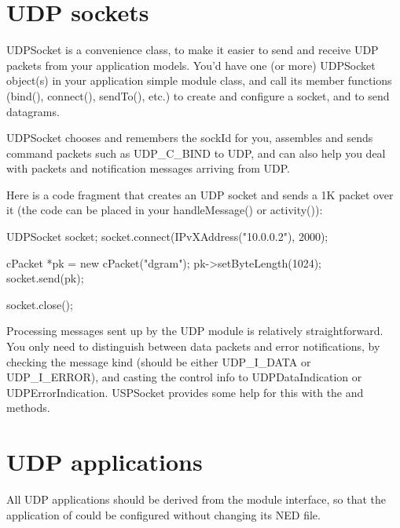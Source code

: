 \section{UDP sockets}

UDPSocket is a convenience class, to make it easier to send and receive
UDP packets from your application models. You'd have one (or more)
UDPSocket object(s) in your application simple module class, and call
its member functions (bind(), connect(), sendTo(), etc.) to create and
configure a socket, and to send datagrams.

UDPSocket chooses and remembers the sockId for you, assembles and sends command
packets such as UDP\_C\_BIND to UDP, and can also help you deal with packets and
notification messages arriving from UDP.

Here is a code fragment that creates an UDP socket and sends a 1K packet
over it (the code can be placed in your handleMessage() or activity()):

\begin{cpp}
UDPSocket socket;
socket.connect(IPvXAddress("10.0.0.2"), 2000);

cPacket *pk = new cPacket("dgram");
pk->setByteLength(1024);
socket.send(pk);

socket.close();
\end{cpp}


Processing messages sent up by the UDP module is relatively straightforward.
You only need to distinguish between data packets and error notifications,
by checking the message kind (should be either UDP\_I\_DATA or UDP\_I\_ERROR),
and casting the control info to UDPDataIndication or UDPErrorIndication.
USPSocket provides some help for this with the  and
 methods.

\section{UDP applications}

All UDP applications should be derived from the  module interface,
so that the application of  could be configured without changing its NED file.

